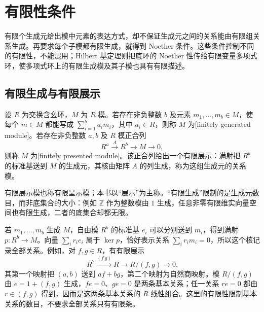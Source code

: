 
\section{有限性条件}
\label{b3:sec:0301}

有限个生成元给出模中元素的表达方式，却不保证生成元之间的关系能由有限组关系生成。再要求每个子模都有限生成，就得到 Noether 条件。这些条件控制不同的有限性，不能混用；Hilbert 基定理则把底环的 Noether 性传给有限变量多项式环，使多项式环上的有限生成模及其子模也具有有限描述。

\subsection{有限生成与有限展示}
\label{b3:subsec:0301:01}

\begin{definition}\label{b3:def:finite-presentation}
	设 \(R\) 为交换含幺环，\(M\) 为 \(R\) 模。若存在非负整数 \(b\) 及元素 \(m_1,\ldots,m_b\in M\)，使每个 \(m\in M\) 都能写成 \(\sum_{i=1}^b a_i m_i\)，其中 \(a_i\in R\)，则称 \(M\) 为[finitely generated module]。若存在非负整数 \(a,b\) 及 \(R\) 模正合列
	\[
		R^a\xrightarrow{A}R^b\longrightarrow M\longrightarrow0,
	\]
	则称 \(M\) 为[finitely presented module]。该正合列给出一个有限展示：满射把 \(R^b\) 的标准基送到 \(M\) 的生成元，其核由矩阵 \(A\) 的列生成，称为这组生成元的关系模。
\end{definition}
有限展示模也称有限呈示模；本书以“展示”为主称。“有限生成”限制的是生成元数目，而非底集合的大小：例如 \(\mathbb Z\) 作为整数模由 \(1\) 生成，任意非零有限维实向量空间也有限生成，二者的底集合却都无限。

\ProseParagraphBreak
若 \(m_1,\ldots,m_b\) 生成 \(M\)，自由模 \(R^b\) 的标准基 \(e_i\) 可以分别送到 \(m_i\)，得到满射 \(p:R^b\to M\)。向量 \(\sum_i r_i e_i\) 属于 \(\ker p\)，恰好表示关系 \(\sum_i r_i m_i=0\)，所以这个核记录全部关系。例如，对 \(f,g\in R\)，有有限展示
\[
	R^2\xrightarrow{(f\ g)}R\longrightarrow R/(f,g)\longrightarrow0.
\]
其第一个映射把 \((a,b)\) 送到 \(af+bg\)，第二个映射为自然商映射。模 \(R/(f,g)\) 由 \(e=1+(f,g)\) 生成，\(fe=0\)、\(ge=0\) 是两条基本关系；任一关系 \(re=0\) 都由 \(r\in(f,g)\) 得到，因而是这两条基本关系的 \(R\) 线性组合。这里的有限性限制基本关系的数目，不要求全部关系只有有限条。

